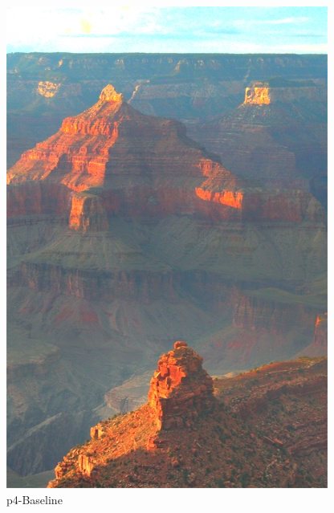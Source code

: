 \documentclass[12pt]{article}
\begin{document}
\begin{figure}[!h]
\begin{minipage}[t]{0.24\linewidth}
        \includegraphics[width=0.9\linewidth]{sample_pictures/after_p4_Baseline.jpg}
        \caption*{p4-Baseline}
    \end{minipage}
    \begin{minipage}[t]{0.24\linewidth}
        \centering

\end{minipage}
\end{figure}
\end{document}
